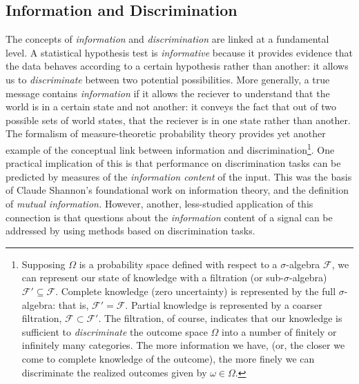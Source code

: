 \subsection{Information and Discrimination}
The concepts of \emph{information} and \emph{discrimination} are
linked at a fundamental level.  A statistical hypothesis test is
\emph{informative} because it provides evidence that the data behaves
according to a certain hypothesis rather than another: it allows us to
\emph{discriminate} between two potential possibilities.  More
generally, a true message contains \emph{information} if it allows the
reciever to understand that the world is in a certain state and not
another: it conveys the fact that out of two possible sets of world
states, that the reciever is in one state rather than another.  The
formalism of measure-theoretic probability theory provides yet another
example of the conceptual link between information and
discrimination\footnote{Supposing $\Omega$ is a probability space
  defined with respect to a $\sigma$-algebra $\mathcal{F}$, we can
  represent our state of knowledge with a filtration (or
  sub-$\sigma$-algebra) $\mathcal{F}' \subseteq \mathcal{F}$.
  Complete knowledge (zero uncertainty) is represented by the full
  $\sigma$-algebra: that is, $\mathcal{F}' = \mathcal{F}$.  Partial
  knowledge is represented by a coarser filtration, $\mathcal{F}
  \subset \mathcal{F}'$.  The filtration, of course, indicates that
  our knowledge is sufficient to \emph{discriminate} the outcome space
  $\Omega$ into a number of finitely or infinitely many categories.
  The more information we have, (or, the closer we come to complete
  knowledge of the outcome), the more finely we can discriminate the
  realized outcomes given by $\omega \in \Omega$.}.
One practical implication of this is that performance on
discrimination tasks can be predicted by measures of the
\emph{information content} of the input. This was the basis of Claude
Shannon's foundational work on information theory, and the definition
of \emph{mutual information.}  However, another, less-studied
application of this connection is that questions about the
\emph{information} content of a signal can be addressed by using
methods based on discrimination tasks.




